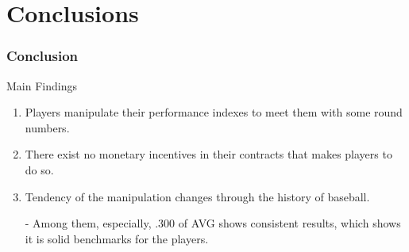 \documentclass[dvipdfmx,12pt]{beamer}
\begin{document}
\section{Conclusions}
\begin{frame}\frametitle{Conclusion}
  Main Findings
  \begin{enumerate}
    \item Players manipulate their performance indexes to meet them with some round numbers.

    \item There exist no monetary incentives in their contracts that makes players to do so.

    \item Tendency of the manipulation changes through the history of baseball.

    - Among them, especially, .300 of AVG shows consistent results, which shows it is solid benchmarks for the players.
  \end{enumerate}
\end{frame}
\end{document}
